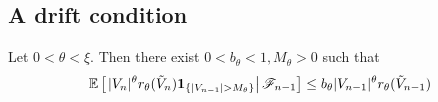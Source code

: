 \subsection{A drift condition}
\begin{lemma}
  \label{lemma:1}
  Let $0 < \theta < \xi$. Then there exist
  $0 < b_{\theta} < 1, M_{\theta} > 0$
  such that
  \begin{equation}
    \label{eq:drift}
    \mathbb{E} \left[\left.
      |V_n|^\theta r_\theta(\tilde V_n)
      \mathbf{1}_{\{|V_{n-1}| > M_{\theta}\}} \right|
      \mathscr F_{n-1} \right]
    \leq
    b_{\theta} |V_{n-1}|^\theta
    r_{\theta}(\tilde V_{n-1})
  \end{equation}
\end{lemma}
